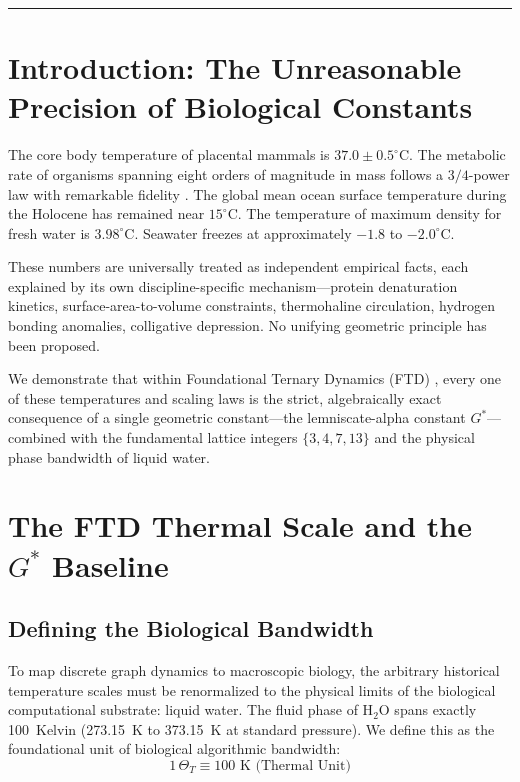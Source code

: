 \documentclass[11pt, letterpaper]{article}
\newcommand{\G}{G^*}
\theoremstyle{definition}
\theoremstyle{remark}
\begin{document}
\vspace{1em}
\hrule
\vspace{1.5em}

\section{Introduction: The Unreasonable Precision of Biological Constants}

The core body temperature of placental mammals is $37.0 \pm 0.5^\circ$C. The metabolic rate of organisms spanning eight orders of magnitude in mass follows a $3/4$-power law with remarkable fidelity \cite{Kleiber1932}. The global mean ocean surface temperature during the Holocene has remained near $15^\circ$C. The temperature of maximum density for fresh water is $3.98^\circ$C. Seawater freezes at approximately $-1.8$ to $-2.0^\circ$C.

These numbers are universally treated as independent empirical facts, each explained by its own discipline-specific mechanism---protein denaturation kinetics, surface-area-to-volume constraints, thermohaline circulation, hydrogen bonding anomalies, colligative depression. No unifying geometric principle has been proposed.

We demonstrate that within Foundational Ternary Dynamics (FTD) \cite{Anon2026_Zenodo}, every one of these temperatures and scaling laws is the strict, algebraically exact consequence of a single geometric constant---the lemniscate-alpha constant $\G$---combined with the fundamental lattice integers $\{3, 4, 7, 13\}$ and the physical phase bandwidth of liquid water.

\section{The FTD Thermal Scale and the $\G$ Baseline}

\subsection{Defining the Biological Bandwidth}

To map discrete graph dynamics to macroscopic biology, the arbitrary historical temperature scales must be renormalized to the physical limits of the biological computational substrate: liquid water. The fluid phase of H$_2$O spans exactly 100~Kelvin (273.15~K to 373.15~K at standard pressure). We define this as the foundational unit of biological algorithmic bandwidth:
\begin{equation}
    1\,\Theta_T \equiv 100 \text{ K (Thermal Unit)}
\end{equation}
\end{document}
